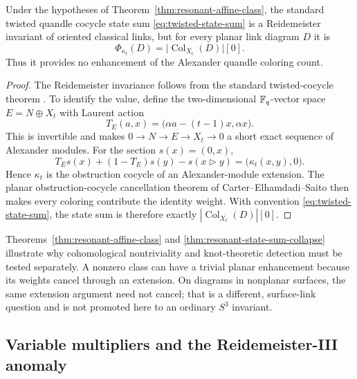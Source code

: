 \begin{theorem}
\label{thm:resonant-state-sum-collapse}
Under the hypotheses of Theorem~\ref{thm:resonant-affine-class}, the standard
twisted quandle cocycle state sum \eqref{eq:twisted-state-sum} is a Reidemeister
invariant of oriented classical links, but for every planar link diagram $D$ it is
\begin{equation}
 \Phi_{\kappa_t}(D)=
 \bigl|\operatorname{Col}_{X_t}(D)\bigr|[0].
 \label{eq:planar-state-sum-collapse}
\end{equation}
Thus it provides no enhancement of the Alexander quandle coloring count.
\end{theorem}

\begin{proof}
The Reidemeister invariance follows from the standard twisted-cocycle theorem
\cite{CarterElhamdadiSaito2002TwistedQuandle}.  To identify the value, define the
two-dimensional $\mathbb{F}_q$-vector space $E=N\oplus X_t$ with Laurent action
\begin{equation}
 T_E(a,x)=\bigl(\alpha a-(t-1)x,\alpha x\bigr).
 \label{eq:extension-action}
\end{equation}
This is invertible and makes
$0\to N\to E\to X_t\to0$ a short exact sequence of Alexander modules.  For the
section $s(x)=(0,x)$,
\begin{equation}
 T_Es(x)+(1-T_E)s(y)-s(x\triangleright y)
 =\bigl(\kappa_t(x,y),0\bigr).
 \label{eq:kappa-obstruction}
\end{equation}
Hence $\kappa_t$ is the obstruction cocycle of an Alexander-module extension.
The planar obstruction-cocycle cancellation theorem of
Carter--Elhamdadi--Saito then makes every coloring contribute the identity weight.
With convention \eqref{eq:twisted-state-sum}, the state sum is therefore exactly
$|\operatorname{Col}_{X_t}(D)|[0]$.
\end{proof}

Theorems~\ref{thm:resonant-affine-class} and
\ref{thm:resonant-state-sum-collapse} illustrate why cohomological nontriviality
and knot-theoretic detection must be tested separately.  A nonzero class can have a
trivial planar enhancement because its weights cancel through an extension.
On diagrams in nonplanar surfaces, the same extension argument need not cancel;
that is a different, surface-link question and is not promoted here to an ordinary
$S^3$ invariant.

\subsection{Variable multipliers and the Reidemeister-III anomaly}

